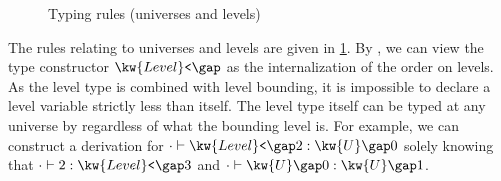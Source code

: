 \documentclass[a4paper,UKenglish,cleveref,autoref,thm-restate]{lipics-v2021}
\begin{document}
\begin{figure}
\caption{Typing rules (universes and levels)}
\label{fig:typing:univ}
\end{figure}

The rules relating to universes and levels are given in \cref{fig:typing:univ}.
By , we can view the type constructor $ \kw{Level}\texttt{<} \gap   \relax  $
as the internalization of the order on levels.
As the level type is combined with level bounding,
it is impossible to declare a level variable strictly less than itself.
The level type itself can be typed at any universe by 
regardless of what the bounding level is.
For example, we can construct a derivation for $  \cdot   \vdash   \kw{Level}\texttt{<} \gap   2    \mathrel{:}   \kw{U} \gap   0   $
solely knowing that $  \cdot   \vdash   2   \mathrel{:}   \kw{Level}\texttt{<} \gap   3   $ and $  \cdot   \vdash   \kw{U} \gap   0    \mathrel{:}   \kw{U} \gap   1   $.
\end{document}
